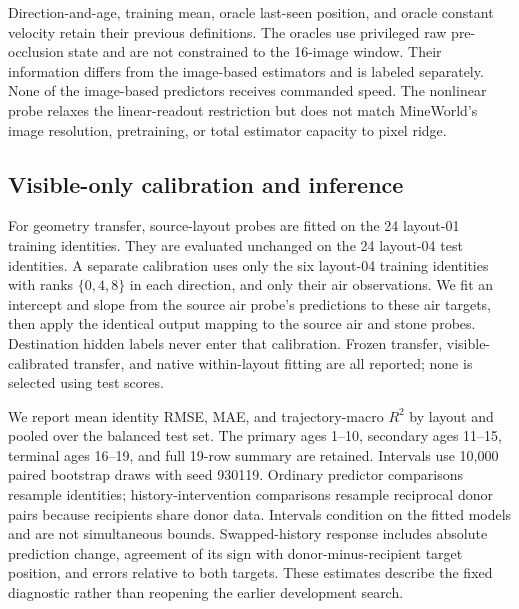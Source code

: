 Direction-and-age, training mean, oracle last-seen position, and oracle constant velocity retain their previous definitions. The oracles use privileged raw pre-occlusion state and are not constrained to the 16-image window. Their information differs from the image-based estimators and is labeled separately. None of the image-based predictors receives commanded speed. The nonlinear probe relaxes the linear-readout restriction but does not match MineWorld's image resolution, pretraining, or total estimator capacity to pixel ridge.

\subsection{Visible-only calibration and inference}
For geometry transfer, source-layout probes are fitted on the 24 layout-01 training identities. They are evaluated unchanged on the 24 layout-04 test identities. A separate calibration uses only the six layout-04 training identities with ranks $\{0,4,8\}$ in each direction, and only their air observations. We fit an intercept and slope from the source air probe's predictions to these air targets, then apply the identical output mapping to the source air and stone probes. Destination hidden labels never enter that calibration. Frozen transfer, visible-calibrated transfer, and native within-layout fitting are all reported; none is selected using test scores.

We report mean identity RMSE, MAE, and trajectory-macro $R^2$ by layout and pooled over the balanced test set. The primary ages 1--10, secondary ages 11--15, terminal ages 16--19, and full 19-row summary are retained. Intervals use 10,000 paired bootstrap draws with seed 930119. Ordinary predictor comparisons resample identities; history-intervention comparisons resample reciprocal donor pairs because recipients share donor data. Intervals condition on the fitted models and are not simultaneous bounds. Swapped-history response includes absolute prediction change, agreement of its sign with donor-minus-recipient target position, and errors relative to both targets. These estimates describe the fixed diagnostic rather than reopening the earlier development search.
